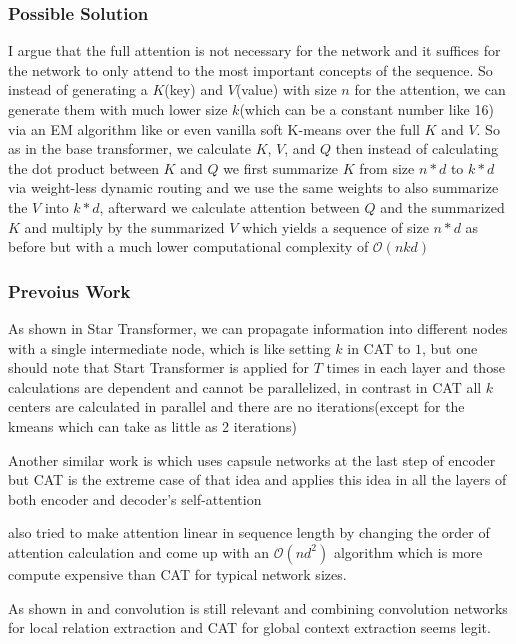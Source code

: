 \documentclass{article}
\begin{document}
\subsubsection{Possible Solution}
I argue that the full attention is not necessary for the network and it suffices for the network to only attend to the most important concepts of the sequence. So instead of generating a $K$(key) and $V$(value) with size $n$ for the attention, we can generate them with much lower size $k$(which can be a constant number like 16) via an EM algorithm like \citep{1805.10807} or even vanilla soft K-means over the full $K$ and $V$.
So as in the base transformer, we calculate $K$, $V$, and $Q$ then instead of calculating the dot product between $K$ and $Q$ we first summarize $K$ from size $n*d$ to $k*d$ via weight-less dynamic routing and we use the same weights to also summarize the $V$ into $k*d$, afterward we calculate attention between $Q$ and the summarized $K$ and multiply by the summarized $V$ which yields a sequence of size $n*d$ as before but with a much lower computational complexity of $\mathcal{O}(nkd)$

\subsubsection{Prevoius Work}
As shown in Star Transformer\citep{1902.09113}, we can propagate information into different nodes with a single intermediate node, which is like setting $k$ in CAT to $1$, but one should note that Start Transformer is applied for $T$ times in each layer and those calculations are dependent and cannot be parallelized, in contrast in CAT all $k$ centers are calculated in parallel and there are no iterations(except for the kmeans which can take as little as 2 iterations)

Another similar work is\citep{1811.00287} which uses capsule networks at the last step of encoder but CAT is the extreme case of that idea and applies this idea in all the layers of both encoder and decoder's self-attention

\citep{1812.01243} also tried to make attention linear in sequence length by changing the order of attention calculation and come up with an $\mathcal{O}(nd^{2})$ algorithm which is more compute expensive than CAT for typical network sizes.

As shown in \citep{1901.11117} and \citep{1901.10430} convolution is still relevant and combining convolution networks for local relation extraction and CAT for global context extraction seems legit.
\end{document}
